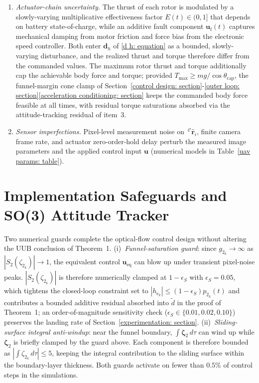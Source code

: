 \documentclass{IEEEtaes}
\begin{document}
\begin{enumerate}
    \item \emph{Actuator-chain uncertainty.} The thrust of each rotor is modulated by a slowly-varying multiplicative effectiveness factor $E(t)\in(0,1]$ that depends on battery state-of-charge, while an additive fault component $\boldsymbol{u}_\text{f}(t)$ captures mechanical damping from motor friction and force bias from the electronic speed controller. Both enter $\boldsymbol{d}_h$ of \eqref{d h: equation} as a bounded, slowly-varying disturbance, and the realized thrust and torque therefore differ from the commanded values. The maximum rotor thrust and torque additionally cap the achievable body force and torque; provided $T_\text{max}\ge mg/\cos\theta_\text{cap}$, the funnel-margin cone clamp of Section~\ref{control design: section}-\ref{outer loop: section}\ref{acceleration conditioning: section} keeps the commanded body force feasible at all times, with residual torque saturations absorbed via the attitude-tracking residual of item~3.
    \item \emph{Sensor imperfections.} Pixel-level measurement noise on $\,^\mathcal{C}\hat{\boldsymbol{r}}_i$, finite camera frame rate, and actuator zero-order-hold delay perturb the measured image parameters and the applied control input $\boldsymbol{u}$ (numerical models in Table~\ref{uav params: table}).
\end{enumerate}

\section{Implementation Safeguards and SO(3) Attitude Tracker} \label{implementation appendix: section}
Two numerical guards complete the optical-flow control design without altering the UUB conclusion of Theorem~1. (i)~\emph{Funnel-saturation guard}: since $g_{2_k}\to\infty$ as $|S_2(\zeta_{2_k})|\to 1$, the equivalent control $\boldsymbol{u}_\text{eq}$ can blow up under transient pixel-noise peaks. $|S_2(\zeta_{2_k})|$ is therefore numerically clamped at $1-\epsilon_S$ with $\epsilon_S=0.05$, which tightens the closed-loop constraint set to $|h_{\text{e}_k}|\le(1-\epsilon_S)p_{2_k}(t)$ and contributes a bounded additive residual absorbed into $\tilde{d}$ in the proof of Theorem~1; an order-of-magnitude sensitivity check ($\epsilon_S\in\{0.01,0.02,0.10\}$) preserves the landing rate of Section~\ref{experimentation: section}. (ii)~\emph{Sliding-surface integral anti-windup}: near the funnel boundary, $\int\boldsymbol{\zeta}_2\,d\tau$ can wind up while $\boldsymbol{\zeta}_2$ is briefly clamped by the guard above. Each component is therefore bounded as $|\!\int\!\zeta_{2_k}\,d\tau|\le 5$, keeping the integral contribution to the sliding surface within the boundary-layer thickness. Both guards activate on fewer than $0.5\%$ of control steps in the simulations.
\end{document}
